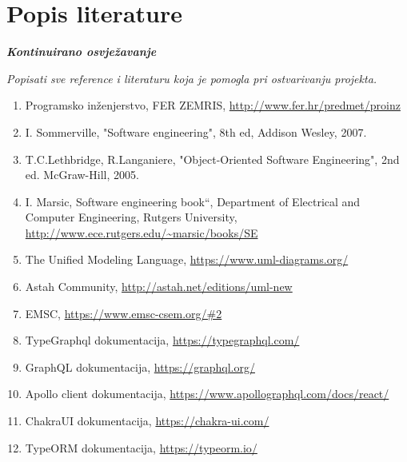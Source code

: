 \chapter*{Popis literature}
	 	
 		\textbf{\textit{Kontinuirano osvježavanje}}
	
		\textit{Popisati sve reference i literaturu koja je pomogla pri ostvarivanju projekta.}
		
		
		\begin{enumerate}
			
			
			\item  Programsko inženjerstvo, FER ZEMRIS, \url{http://www.fer.hr/predmet/proinz}
			
			\item  I. Sommerville, "Software engineering", 8th ed, Addison Wesley, 2007.
			
			\item  T.C.Lethbridge, R.Langaniere, "Object-Oriented Software Engineering", 2nd ed. McGraw-Hill, 2005.
			
			\item  I. Marsic, Software engineering book``, Department of Electrical and Computer Engineering, Rutgers University, \url{http://www.ece.rutgers.edu/~marsic/books/SE}
			
			\item  The Unified Modeling Language, \url{https://www.uml-diagrams.org/}
			
			\item  Astah Community, \url{http://astah.net/editions/uml-new}
			
			\item EMSC, \url{https://www.emsc-csem.org/#2}
			
			\item TypeGraphql dokumentacija, \url{https://typegraphql.com/}

            \item GraphQL dokumentacija, \url{https://graphql.org/}

            \item Apollo client dokumentacija, \url{https://www.apollographql.com/docs/react/}

            \item ChakraUI dokumentacija, \url{https://chakra-ui.com/}

            \item TypeORM dokumentacija, \url{https://typeorm.io/}

		\end{enumerate}
		
		 